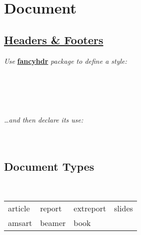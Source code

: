 \section{Document}

\subsection*{\href{https://www.overleaf.com/learn/latex/headers\_and\_footers}{Headers \& Footers}}
\textit{Use }\textbf{\href{http://mirrors.ctan.org/macros/latex/contrib/fancyhdr/fancyhdr.pdf}{fancyhdr}}\textit{ package to define a style: }\\
\\
\\
\\
\\
\code{\}}\\
\textit{\dots and then declare its use: }\\
\\
\\




\subsection*{Document Types}

\\
\begin{tabular}{l l l l}
    article     & 
    report      &
    extreport   &
    slides      \\
    amsart      &
    beamer      &
    book        &
\end{tabular}%
\\

